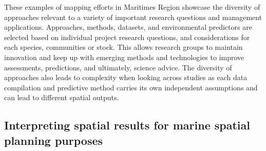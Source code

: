 \documentclass[12pt]{article}\usepackage[]{graphicx}\usepackage[]{color}
\begin{document}
These examples of mapping efforts in Maritimes Region showcase the diversity of approaches relevant to a variety of important research questions and management applications. Approaches, methods, datasets, and environmental predictors are selected based on individual project research questions, and considerations for each species, communities or stock. This allows research groups to maintain innovation and keep up with emerging methods and technologies to improve assessments, predictions, and ultimately, science advice. The diversity of approaches also leads to complexity when looking across studies as each data compilation and predictive method carries its own independent assumptions and can lead to different spatial outputs.

\hypertarget{interpreting-spatial-results-for-marine-spatial-planning-purposes}{%
\subsection{Interpreting spatial results for marine spatial planning purposes}\label{interpreting-spatial-results-for-marine-spatial-planning-purposes}}
\end{document}
